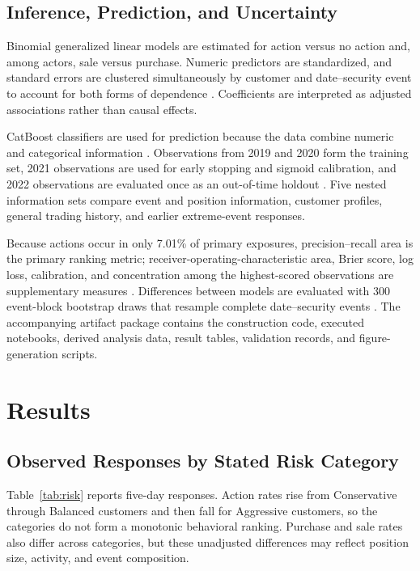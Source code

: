\documentclass[conference]{IEEEtran}
\newcommand{\pct}{\%}
\begin{document}
\subsection{Inference, Prediction, and Uncertainty}
Binomial generalized linear models are estimated for action versus no action and, among actors, sale versus purchase. Numeric predictors are standardized, and standard errors are clustered simultaneously by customer and date--security event to account for both forms of dependence \cite{cameron2011multiway}. Coefficients are interpreted as adjusted associations rather than causal effects.

CatBoost classifiers are used for prediction because the data combine numeric and categorical information \cite{prokhorenkova2018catboost}. Observations from 2019 and 2020 form the training set, 2021 observations are used for early stopping and sigmoid calibration, and 2022 observations are evaluated once as an out-of-time holdout \cite{platt1999probabilistic}. Five nested information sets compare event and position information, customer profiles, general trading history, and earlier extreme-event responses.

Because actions occur in only 7.01\pct{} of primary exposures, precision--recall area is the primary ranking metric; receiver-operating-characteristic area, Brier score, log loss, calibration, and concentration among the highest-scored observations are supplementary measures \cite{saito2015precision}. Differences between models are evaluated with 300 event-block bootstrap draws that resample complete date--security events \cite{efron1993bootstrap}. The accompanying artifact package contains the construction code, executed notebooks, derived analysis data, result tables, validation records, and figure-generation scripts.

\section{Results}
\subsection{Observed Responses by Stated Risk Category}
Table~\ref{tab:risk} reports five-day responses. Action rates rise from Conservative through Balanced customers and then fall for Aggressive customers, so the categories do not form a monotonic behavioral ranking. Purchase and sale rates also differ across categories, but these unadjusted differences may reflect position size, activity, and event composition.
\end{document}
